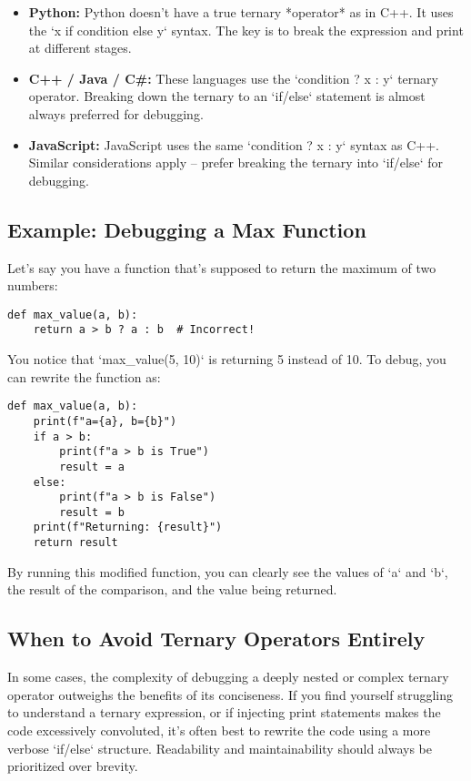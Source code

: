 \documentclass{article}
\begin{document}
{{{{\begin{itemize}
    \item \textbf{Python:}  Python doesn't have a true ternary *operator* as in C++.  It uses the `x if condition else y` syntax. The key is to break the expression and print at different stages.
    \item \textbf{C++ / Java / C#:} These languages use the `condition ? x : y` ternary operator.  Breaking down the ternary to an `if/else` statement is almost always preferred for debugging.
    \item \textbf{JavaScript:} JavaScript uses the same `condition ? x : y` syntax as C++. Similar considerations apply – prefer breaking the ternary into `if/else` for debugging.
\end{itemize}

\subsection*{Example: Debugging a Max Function}

Let's say you have a function that's supposed to return the maximum of two numbers:

\begin{verbatim}
def max_value(a, b):
    return a > b ? a : b  # Incorrect!
\end{verbatim}

You notice that `max_value(5, 10)` is returning 5 instead of 10. To debug, you can rewrite the function as:

\begin{verbatim}
def max_value(a, b):
    print(f"a={a}, b={b}")
    if a > b:
        print(f"a > b is True")
        result = a
    else:
        print(f"a > b is False")
        result = b
    print(f"Returning: {result}")
    return result
\end{verbatim}

By running this modified function, you can clearly see the values of `a` and `b`, the result of the comparison, and the value being returned.

\subsection*{When to Avoid Ternary Operators Entirely}

In some cases, the complexity of debugging a deeply nested or complex ternary operator outweighs the benefits of its conciseness. If you find yourself struggling to understand a ternary expression, or if injecting print statements makes the code excessively convoluted, it's often best to rewrite the code using a more verbose `if/else` structure. Readability and maintainability should always be prioritized over brevity.

}}}}
\end{document}
